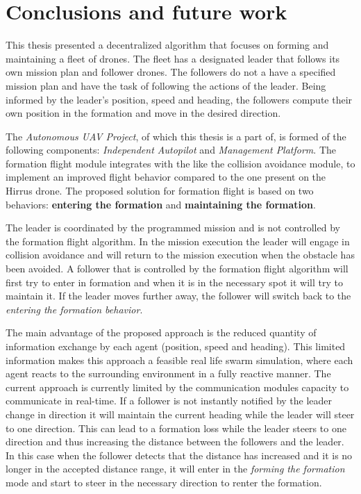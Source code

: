 \chapter{Conclusions and future work}
\label{chapter:conclusionfw}
This thesis presented a decentralized algorithm that focuses on forming and maintaining
a fleet of drones. The fleet has a designated leader that follows its own mission
plan and follower drones. The followers do not a have a specified mission plan 
and have the task of following the actions of the leader. Being informed
by the leader's position, speed and heading,  the followers compute their own
position in the formation and move in the desired direction. 

The \textit{Autonomous UAV Project}, of which this thesis is a part of, is formed
of the following components: \textit{Independent Autopilot} and \textit{Management Platform}.
The formation flight module integrates with the like the collision avoidance module, to implement an 
improved flight behavior compared to the one present on the Hirrus drone. The proposed solution for formation flight is
based on two behaviors: \textbf{entering the formation} and \textbf{maintaining
the formation}.

The leader is coordinated by the programmed mission and is not controlled
by the formation flight algorithm. In the mission execution the leader will
engage in collision avoidance and will return to the mission execution when
the obstacle has been avoided. A follower that is controlled by the formation
flight algorithm will first try to enter in formation and when it is in the
necessary spot it will try to maintain it. If the leader moves further away, 
the follower will switch back to the \textit{entering the formation behavior}.

The main advantage of the proposed approach is the reduced quantity of information
exchange by each agent (position, speed and heading). This limited information
makes this approach a feasible real life swarm simulation, where each agent
reacts to the surrounding environment in a fully reactive manner. The current
approach is currently limited by the communication modules capacity to communicate
in real-time. If a follower is not instantly notified by the leader change in 
direction it will maintain the current heading while the leader will steer to one
direction. This can lead to a formation loss while the leader steers to one direction
and thus increasing the distance between the followers and the leader. In this
case when the follower detects that the distance has increased and it is no longer
in the accepted distance range, it will enter in the \textit{forming the formation}
mode and start to steer in the necessary direction to renter the formation.


